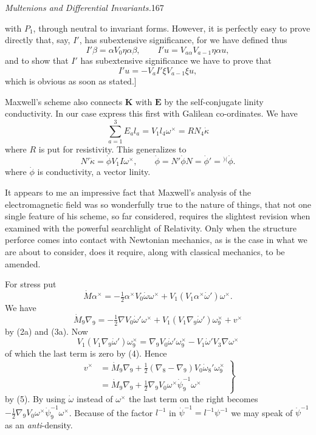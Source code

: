 \documentclass[11pt]{article}
\newcommand{\markpair}[3]{{}^{#1#2}#3}
\begin{document}
\newpage\thispagestyle{empty}\begin{center}\textit{Multenions and Differential Invariants.}\hfill 167\end{center}
with $P_1$, through neutral to invariant forms. However, it is perfectly easy to prove directly that, say, $I'$, has subextensive significance, for we have defined thus
\[
  I'\beta=\alpha V_0\eta\alpha\beta,\qquad I'u=V_{a\alpha}V_{a-1}\eta\alpha u,
\]
and to show that $I'$ has subextensive significance we have to prove that
\[
  I'u=-V_aI'\xi V_{a-1}\xi u,
\]
which is obvious as soon as stated.]

\indent Maxwell's scheme also connects $\mathbf{K}$ with $\mathbf{E}$ by the self-conjugate linity conductivity. In our case express this first with Galilean co-ordinates. We have
\[
  \sum_{a=1}^{3}E_al_a=V_1l_4\omega^\times=RN_4\dot\kappa
\]
where $R$ is put for resistivity. This generalizes to
\begin{equation}
  N'\dot\kappa=\dot\phi V_1I\omega^\times,\qquad
  \dot\phi=N'\dot\phi N=\dot\phi'=\markpair{)}{(}{\dot\phi}.
  \tag{7}
\end{equation}
where $\dot\phi$ is conductivity, a vector linity.

\indent It appears to me an impressive fact that Maxwell's analysis of the electromagnetic field was so wonderfully true to the nature of things, that not one single feature of his scheme, so far considered, requires the slightest revision when examined with the powerful searchlight of Relativity. Only when the structure perforce comes into contact with Newtonian mechanics, as is the case in what we are about to consider, does it require, along with classical mechanics, to be amended.

\indent For stress put
\begin{equation}
  \dot M\alpha^\times=-\tfrac12\alpha^\times V_0\dot\omega\omega^\times+V_1(V_1\alpha^\times\dot\omega')\omega^\times.
  \tag{8}
\end{equation}
We have
\[
  \dot M_9\nabla_9=-\tfrac12\nabla V_0\dot\omega'\omega^\times+V_1(V_1\nabla_9\dot\omega')\omega_9^\times+v^\times
\]
by (2a) and (3a). Now
\[
  V_1(V_1\nabla_9\dot\omega')\omega_9^\times
  =\nabla_9V_0\dot\omega'\omega_9^\times-V_1\dot\omega'V_3\nabla\omega^\times
\]
of which the last term is zero by (4). Hence
\begin{equation}
  \left.\begin{aligned}
    v^\times&=\dot M_9\nabla_9+\tfrac12(\nabla_8-\nabla_9)V_0\dot\omega_8'\omega_9^\times\\
    &=\dot M_9\nabla_9+\tfrac12\nabla_9V_0\omega^\times\dot\psi_9^{-1}\omega^\times
  \end{aligned}\right\}
  \tag{9}
\end{equation}
by (5). By using $\dot\omega$ instead of $\omega^\times$ the last term on the right becomes $-\tfrac12\nabla_9V_0\omega^\times\dot\psi_9^{-1}\omega^\times$. Because of the factor $l^{-1}$ in $\dot\psi^{-1}=l^{-1}\psi^{-1}$ we may speak of $\dot\psi^{-1}$ as an \emph{anti}-density.
\end{document}
